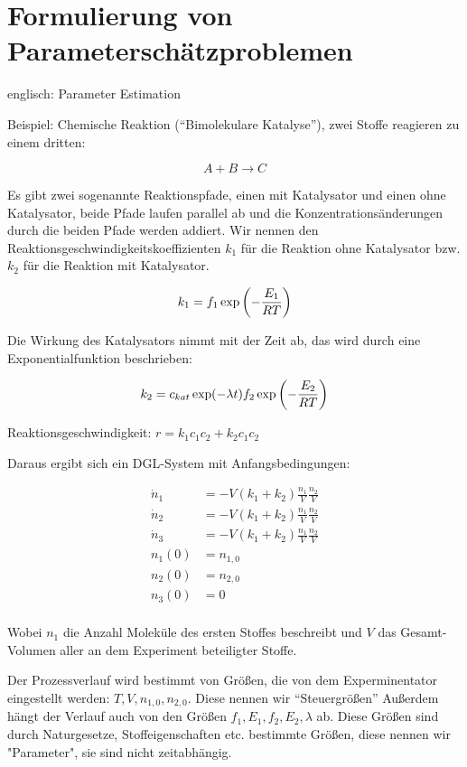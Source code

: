 \chapter*{Formulierung von Parameterschätzproblemen}

englisch: Parameter Estimation

Beispiel: Chemische Reaktion ("`Bimolekulare Katalyse"'), zwei Stoffe reagieren zu einem dritten:

\[A+B \to C\]

Es gibt zwei sogenannte Reaktionspfade, einen mit Katalysator und einen ohne Katalysator, beide Pfade laufen parallel ab und die Konzentrationsänderungen durch die beiden Pfade werden addiert. Wir nennen den Reaktionsgeschwindigkeitskoeffizienten $k_1$ für die Reaktion ohne Katalysator bzw. $k_2$ für die Reaktion mit Katalysator.

\[k_1 = f_1 \exp\left(-\frac{E_1}{RT}\right)\]

Die Wirkung des Katalysators nimmt mit der Zeit ab, das wird durch eine Exponentialfunktion beschrieben:

\[k_2 = c_{kat} \exp(-\lambda t) f_2 \exp\left(-\frac{E_2}{RT}\right)\]

Reaktionsgeschwindigkeit: $r= k_1 c_1 c_2 + k_2 c_1 c_2$

Daraus ergibt sich ein DGL-System mit Anfangsbedingungen:

\begin{align*}
\dot n_1 &= -V(k_1+k_2) \frac{n_1}V \frac{n_2}V \\
\dot n_2 &= -V(k_1+k_2) \frac{n_1}V \frac{n_2}V \\
\dot n_3 &= -V(k_1+k_2) \frac{n_1}V \frac{n_2}V \\
n_1(0) &= n_{1,0} \\
n_2(0) &= n_{2,0} \\
n_3(0) &= 0 \\
\end{align*}

Wobei $n_1$ die Anzahl Moleküle des ersten Stoffes beschreibt und $V$ das Gesamt-Volumen aller an dem Experiment beteiligter Stoffe.


Der Prozessverlauf wird bestimmt von Größen, die von dem Experminentator eingestellt werden: $T,V,n_{1,0},n_{2,0}$. Diese nennen wir "`Steuergrößen"'
Außerdem hängt der Verlauf auch von den Größen $f_1,E_1,f_2,E_2,\lambda$ ab. Diese Größen sind durch Naturgesetze, Stoffeigenschaften etc. bestimmte Größen, diese nennen wir "Parameter", sie sind nicht zeitabhängig.

